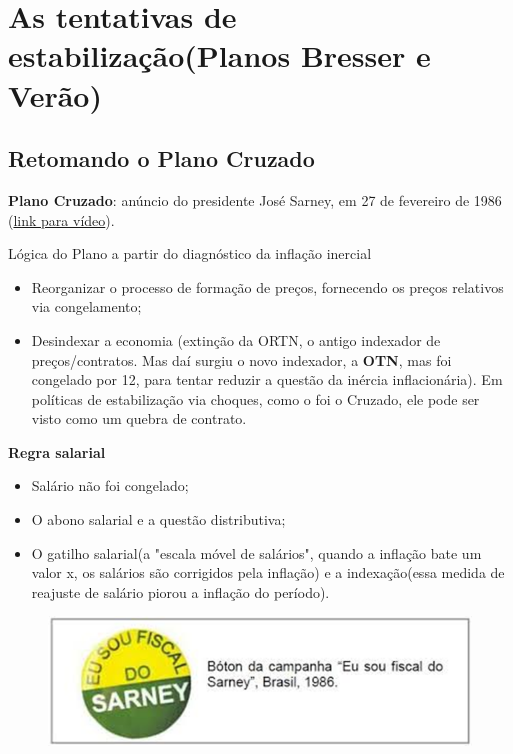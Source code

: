 \documentclass[a4paper,12pt]{article}[abntex2]
\begin{document}
\newpage
\section{\textbf{As tentativas de estabilização(Planos Bresser e Verão)}}
\subsection{\textbf{Retomando o Plano Cruzado}}
\textbf{Plano Cruzado}: anúncio do presidente José Sarney, em 27 de fevereiro de 1986 (\href{https://www.youtube.com/watch?v=TOdzFViggrU}{link para vídeo}).

Lógica do Plano a partir do diagnóstico da inflação inercial\begin{itemize}
    \item Reorganizar o processo de formação de preços, fornecendo os preços relativos via congelamento;
    \item Desindexar a economia (extinção da ORTN, o antigo indexador de preços/contratos. Mas daí surgiu o novo indexador, a \textbf{OTN}, mas foi congelado por 12, para tentar reduzir a questão da inércia inflacionária). Em políticas de estabilização via choques, como o foi o Cruzado, ele pode ser visto como um quebra de contrato.
\end{itemize}

\textbf{Regra salarial}\begin{itemize}
    \item Salário não foi congelado;
    \item O abono salarial e a questão distributiva;
    \item O gatilho salarial(a "escala móvel de salários", quando a inflação bate um valor x, os salários são corrigidos pela inflação) e a indexação(essa medida de reajuste de salário piorou a inflação do período).
\end{itemize}

\begin{figure}[H]
    \centering
    \includegraphics[width=0.7\linewidth]{Imagens/a11i1.png}
\end{figure}
\end{document}
